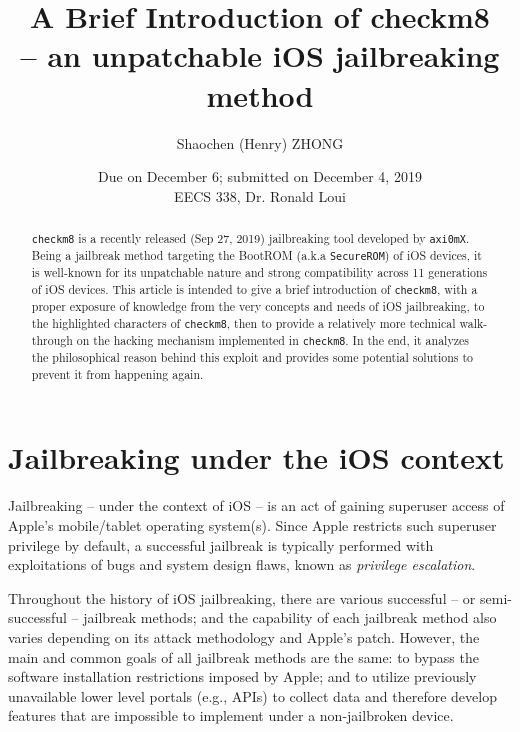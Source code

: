 \documentclass[10pt]{article}
\newcommand{\inlinecode}{\texttt}
\begin{document}
\linespread{1}


\title{\textbf{A Brief Introduction of checkm8} \\
        \large \textbf{-- an unpatchable iOS jailbreaking method\\}}

\author{Shaochen (Henry) ZHONG}
\date{Due on December 6; submitted on December 4, 2019\\EECS 338, Dr. Ronald Loui}
\maketitle

\begin{abstract}
    \inlinecode{checkm8} is a recently released (Sep 27, 2019) jailbreaking tool developed by \inlinecode{axi0mX}. Being a jailbreak method targeting the BootROM (a.k.a \inlinecode{SecureROM}) of iOS devices, it is well-known for its unpatchable nature and strong compatibility across 11 generations of iOS devices. This article is intended to give a brief introduction of \inlinecode{checkm8}, with a proper exposure of knowledge from the very concepts and needs of iOS jailbreaking, to the highlighted characters of \inlinecode{checkm8}, then to provide a relatively more technical walk-through on the hacking mechanism implemented in \inlinecode{checkm8}. In the end, it analyzes the philosophical reason behind this exploit and provides some potential solutions to prevent it from happening again.
\end{abstract}





\vspace{0.5cm}
{\hypersetup{hidelinks}
\tableofcontents
}


\newpage

\section{Jailbreaking under the iOS context}

Jailbreaking -- under the context of iOS -- is an act of gaining superuser access of Apple's mobile/tablet operating system(s). Since Apple restricts such superuser privilege by default, a successful jailbreak is typically performed with exploitations of bugs and system design flaws, known as \textit{privilege escalation}.

Throughout the history of iOS jailbreaking, there are various successful -- or semi-successful -- jailbreak methods; and the capability of each jailbreak method also varies depending on its attack methodology and Apple's patch. However, the main and common goals of all jailbreak methods are the same: to bypass the software installation restrictions imposed by Apple; and to utilize previously unavailable lower level portals (e.g., APIs) to collect data and therefore develop features that are impossible to implement under a non-jailbroken device.
\end{document}
